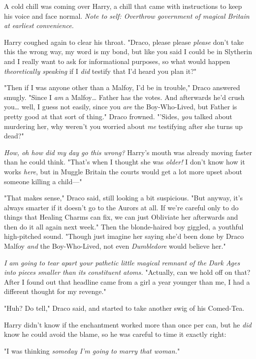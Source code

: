 A cold chill was coming over Harry, a chill that came with instructions to keep
his voice and face normal. \emph{Note to self: Overthrow government of magical
Britain at earliest convenience.}

Harry coughed again to clear his throat. "Draco, please please \emph{please}
don't take this the wrong way, my word is my bond, but like you said I could be
in Slytherin and I really want to ask for informational purposes, so what would
happen \emph{theoretically speaking} if I \emph{did} testify that I'd heard you
plan it?"

"Then if I was anyone other than a Malfoy, I'd be in trouble," Draco answered
smugly. "Since I \emph{am} a Malfoy{\ldots} Father has the votes. And
afterwards he'd crush you{\ldots} well, I guess not easily, since you
\emph{are} the Boy-Who-Lived, but Father is pretty good at that sort of thing."
Draco frowned. "'Sides, \emph{you} talked about murdering her, why weren't you
worried about \emph{me} testifying after she turns up dead?"

\emph{How, oh how did my day go this wrong?} Harry's mouth was already moving
faster than he could think. "That's when I thought she was \emph{older!} I
don't know how it works \emph{here}, but in Muggle Britain the courts would get
a lot more upset about someone killing a child---"

"That makes sense," Draco said, still looking a bit suspicious. "But anyway,
it's always smarter if it doesn't go to the Aurors at all. If we're careful
only to do things that Healing Charms can fix, we can just Obliviate her
afterwards and then do it all again next week." Then the blonde-haired boy
giggled, a youthful high-pitched sound. "Though just imagine her saying she'd
been done by Draco Malfoy \emph{and} the Boy-Who-Lived, not even
\emph{Dumbledore} would believe her."

\emph{I am going to tear apart your pathetic little magical remnant of the Dark
Ages into pieces smaller than its constituent atoms.} "Actually, can we hold
off on that? After I found out that headline came from a girl a year younger
than me, I had a different thought for my revenge."

"Huh? Do tell," Draco said, and started to take another swig of his Comed-Tea.

Harry didn't know if the enchantment worked more than once per can, but he
\emph{did} know he could avoid the blame, so he was careful to time it exactly
right:

"I was thinking \emph{someday I'm going to marry that woman.}"

